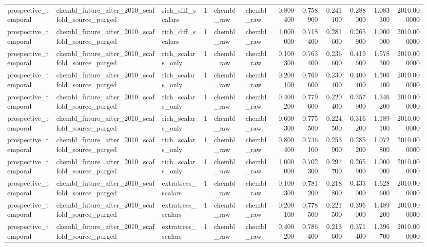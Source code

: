 \begin{longtable}{lllrllrrrrrr}
prospective\_temporal & chembl\_future\_after\_2010\_scaffold\_source\_purged & rich\_diff\_scalars & 1 & chembl\_raw & chembl\_raw & 0.800400 & 0.758900 & 0.241100 & 0.288000 & 1.083300 & 2010.000000 \\
prospective\_temporal & chembl\_future\_after\_2010\_scaffold\_source\_purged & rich\_diff\_scalars & 1 & chembl\_raw & chembl\_raw & 1.000000 & 0.718400 & 0.281600 & 0.265900 & 1.000000 & 2010.000000 \\
prospective\_temporal & chembl\_future\_after\_2010\_scaffold\_source\_purged & rich\_scalars\_only & 1 & chembl\_raw & chembl\_raw & 0.100300 & 0.763400 & 0.236600 & 0.419600 & 1.578300 & 2010.000000 \\
prospective\_temporal & chembl\_future\_after\_2010\_scaffold\_source\_purged & rich\_scalars\_only & 1 & chembl\_raw & chembl\_raw & 0.200100 & 0.769600 & 0.230400 & 0.400400 & 1.506100 & 2010.000000 \\
prospective\_temporal & chembl\_future\_after\_2010\_scaffold\_source\_purged & rich\_scalars\_only & 1 & chembl\_raw & chembl\_raw & 0.400200 & 0.779600 & 0.220400 & 0.357900 & 1.346200 & 2010.000000 \\
prospective\_temporal & chembl\_future\_after\_2010\_scaffold\_source\_purged & rich\_scalars\_only & 1 & chembl\_raw & chembl\_raw & 0.600300 & 0.775500 & 0.224500 & 0.316200 & 1.189100 & 2010.000000 \\
prospective\_temporal & chembl\_future\_after\_2010\_scaffold\_source\_purged & rich\_scalars\_only & 1 & chembl\_raw & chembl\_raw & 0.800400 & 0.746100 & 0.253900 & 0.285200 & 1.072800 & 2010.000000 \\
prospective\_temporal & chembl\_future\_after\_2010\_scaffold\_source\_purged & rich\_scalars\_only & 1 & chembl\_raw & chembl\_raw & 1.000000 & 0.702300 & 0.297700 & 0.265900 & 1.000000 & 2010.000000 \\
prospective\_temporal & chembl\_future\_after\_2010\_scaffold\_source\_purged & extratrees\_scalars & 1 & chembl\_raw & chembl\_raw & 0.100300 & 0.781200 & 0.218800 & 0.433000 & 1.628600 & 2010.000000 \\
prospective\_temporal & chembl\_future\_after\_2010\_scaffold\_source\_purged & extratrees\_scalars & 1 & chembl\_raw & chembl\_raw & 0.200100 & 0.778500 & 0.221500 & 0.396000 & 1.489200 & 2010.000000 \\
prospective\_temporal & chembl\_future\_after\_2010\_scaffold\_source\_purged & extratrees\_scalars & 1 & chembl\_raw & chembl\_raw & 0.400200 & 0.786400 & 0.213600 & 0.371400 & 1.396700 & 2010.000000 \\

\end{longtable}
